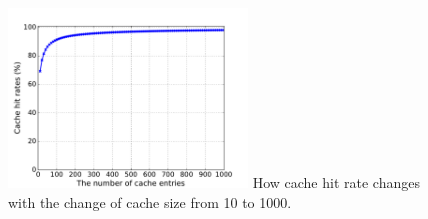 \begin{figure}[t!]
\begin{center}
\includegraphics[width=2.5in]{figure/LRU}
{How cache hit rate changes with the change of cache size from 10 to 1000.}
\end{center}
\end{figure}